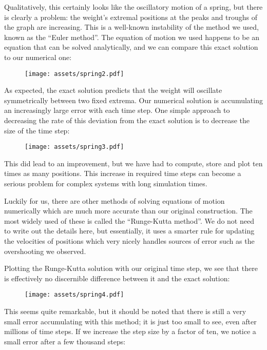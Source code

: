 \documentclass[11pt]{article}
\begin{document}
Qualitatively, this certainly looks like the oscillatory motion of a spring, but there is clearly a problem: the weight's extremal positions at the peaks and troughs of the graph are increasing. This is a well\hyp{}known instability of the method we used, known as the ``Euler method''. The equation of motion we used happens to be an equation that can be solved analytically, and we can compare this exact solution to our numerical one:

\begin{figure}[htbp]
\centering
\texttt{[image: assets/spring2.pdf]}
\label{plot:spring2}
\end{figure}

As expected, the exact solution predicts that the weight will oscillate symmetrically between two fixed extrema. Our numerical solution is accumulating an increasingly large error with each time step. One simple approach to decreasing the rate of this deviation from the exact solution is to decrease the size of the time step:

\begin{figure}[htbp]
\centering
\texttt{[image: assets/spring3.pdf]}
\label{plot:spring3}
\end{figure}

This did lead to an improvement, but we have had to compute, store and plot ten times as many positions. This increase in required time steps can become a serious problem for complex systems with long simulation times.
\newpage

Luckily for us, there are other methods of solving equations of motion numerically which are much more accurate than our original construction. The most widely used of these is called the ``Runge\hyp{}Kutta method''. We do not need to write out the details here, but essentially, it uses a smarter rule for updating the velocities of positions which very nicely handles sources of error such as the overshooting we observed.
\newline

Plotting the Runge\hyp{}Kutta solution with our original time step, we see that there is effectively no discernible difference between it and the exact solution:

\begin{figure}[htbp]
\centering
\texttt{[image: assets/spring4.pdf]}
\label{plot:spring4}
\end{figure}

This seems quite remarkable, but it should be noted that there is still a very small error accumulating with this method; it is just too small to see, even after millions of time steps. If we increase the step size by a factor of ten, we notice a small error after a few thousand steps:
\end{document}
